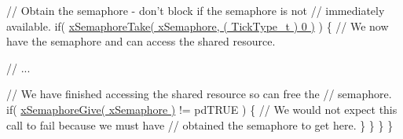 \begin{DoxyPre}       // Obtain the semaphore - don't block if the semaphore is not
       // immediately available.
       if( \hyperlink{semphr_8h_af116e436d2a5ae5bd72dbade2b5ea930}{xSemaphoreTake( xSemaphore, ( TickType\_t ) 0 )} )
       \{
           // We now have the semaphore and can access the shared resource.\end{DoxyPre}



\begin{DoxyPre}           // ...\end{DoxyPre}



\begin{DoxyPre}           // We have finished accessing the shared resource so can free the
           // semaphore.
           if( \hyperlink{semphr_8h_aae55761cabfa9bf85c8f4430f78c0953}{xSemaphoreGive( xSemaphore )} != pdTRUE )
           \{
               // We would not expect this call to fail because we must have
               // obtained the semaphore to get here.
           \}
       \}
   \}
\}
\end{DoxyPre}
 